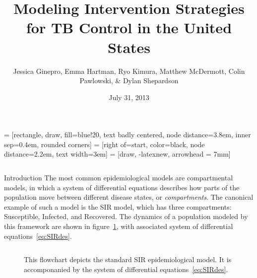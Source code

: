\documentclass[final]{beamer}
\title{\huge Modeling Intervention Strategies for TB Control in the United States}
\author{Jessica Ginepro, Emma Hartman, Ryo Kimura, Matthew McDermott, Colin
        Pawlowski, \& Dylan Shepardson}
\institute[MHC]{Mathematical Modeling Group, Mount Holyoke College, South
                Hadley, MA, USA}
\date[July 31, 2013]{July 31, 2013}
\begin{document}
 = [rectangle, draw, fill=blue!20, text badly centered,
  node distance=3.8em, inner sep=0.4em, rounded corners]
 = [right of=start, color=black, node distance=2.2em,
text width=3em]
 = [draw, -latexnew, arrowhead = 7mm]


\begin{frame}
  \begin{columns}
    \begin{column}{.3\textwidth}
      \begin{block}{Introduction}
        The most common epidemiological models are compartmental models, in
        which a system of differential equations describes how parts of the
        population move between different disease states, or
        \emph{compartments}. The canonical example of such a model is the SIR
        model, which has three compartments: Susceptible, Infected, and
        Recovered. The dynamics of a population modeled by this framework are
        shown in figure~\ref{fig:SIRFlowchart}, with associated system of
        differential equations~\ref{eq:SIRdes}.
        \vspace{-3em}
        \begin{block}{}
          \begin{column}{.39\textwidth}
            \begin{figure}[h]
              \begin{center}
              \end{center}
              \caption{This flowchart depicts the standard SIR epidemiological
                       model. It is accomponanied by the system of differential
                       equations~\ref{eq:SIRdes}.}
              \label{fig:SIRFlowchart}
            \end{figure}
          \end{column}
          \begin{column}{.39\textwidth}

\end{column}
\end{block}
\end{block}
\end{column}
\end{columns}
\end{frame}
\end{document}
